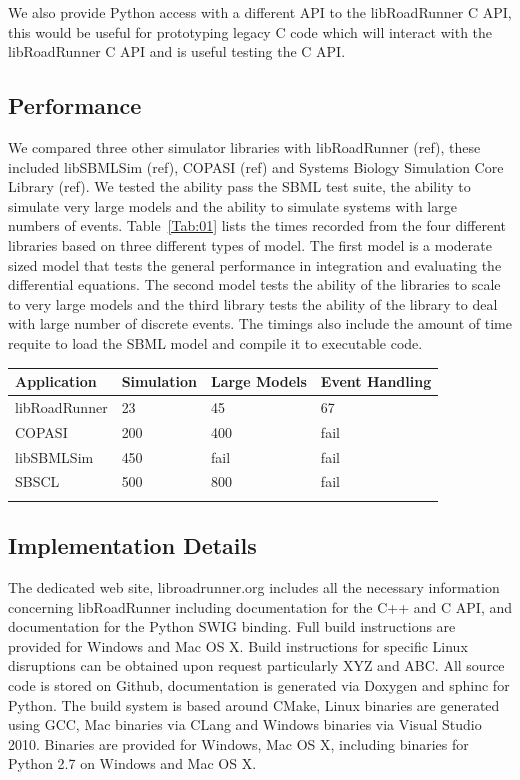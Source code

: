 \documentclass{bioinfo}
\begin{document}
\begin{methods}
We also provide Python access with a different API to the libRoadRunner C API, this would be useful for prototyping legacy C code which will interact with the libRoadRunner C API and is useful testing the C API.  

\subsection{Performance}

We compared three other simulator libraries with libRoadRunner (ref), these included libSBMLSim (ref), COPASI (ref) and Systems Biology Simulation Core Library (ref). We tested the ability pass the SBML test suite, the ability to simulate very large models and the ability to simulate systems with large numbers of events. Table~\ref{Tab:01} lists the times recorded from the four different libraries based on three different types of model. The first model is a moderate sized model that tests the general performance in integration and evaluating the differential equations. The second model tests the ability of the libraries to scale to very large models and the third library tests the ability of the library to deal with large number of discrete events. The timings also include the amount of time requite to load the SBML model and compile it to executable code.
%
\begin{table}[!t]
{\begin{tabular}{llll}\toprule
Application & Simulation & Large Models & Event Handling\\\midrule
libRoadRunner & 23 & 45 & 67  \\
COPASI & 200 & 400 & fail\\
libSBMLSim & 450 & fail & fail\\
SBSCL & 500 & 800 & fail \\ \botrule
\end{tabular}}{}
\end{table}

\subsection*{Implementation Details}

The dedicated web site, libroadrunner.org includes all the necessary information concerning libRoadRunner including documentation for the C++ and C API, and documentation for the Python SWIG binding. Full build instructions are provided for Windows and Mac OS X. Build instructions for specific Linux disruptions can be obtained upon request particularly XYZ and ABC. All source code is stored on Github, documentation is generated via Doxygen and sphinc for Python. The build system is based around CMake, Linux binaries are generated using GCC, Mac binaries via CLang \citealp{Boffelli03} and Windows binaries via Visual Studio 2010. Binaries are provided for Windows, Mac OS X, including binaries for Python 2.7 on Windows and Mac OS X.



\end{methods}
\end{document}
